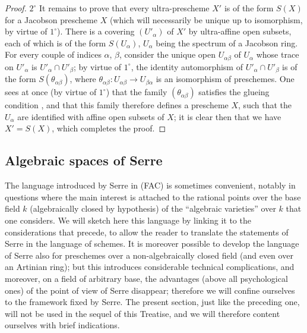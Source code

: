 \begin{proof}
$2^\circ$ It remains to prove that every ultra-prescheme $X'$ is of the form $S(X)$ for a Jacobson prescheme $X$ (which will necessarily be unique up to isomorphism, by virtue of $1^\circ$).
There is a covering $(U'_\alpha)$ of $X'$ by ultra-affine open subsets, each of which is of the form $S(U_\alpha)$, $U_\alpha$ being the spectrum of a Jacobson ring.
For every couple of indices $\alpha$, $\beta$, consider the unique open $U_{\alpha\beta}$ of $U_\alpha$ whose trace on $U'_\alpha$ is $U'_\alpha\cap U'_\beta$; by virtue of $1^\circ$, the identity automorphism of $U'_\alpha\cap U'_\beta$ is of the form $S(\theta_{\alpha\beta})$, where $\theta_{\alpha\beta}:U_{\alpha\beta}\to U_{\beta\alpha}$ is an isomorphism of preschemes.
One sees at once (by virtue of $1^\circ$) that the family $(\theta_{\alpha\beta})$ satisfies the glueing condition , and that this family therefore defines a prescheme $X$, such that the $U_\alpha$ are identified with affine open subsets of $X$; it is clear then that we have $X'=S(X)$, which completes the proof.
\end{proof}

\subsection{Algebraic spaces of Serre}
\label{subsection:IV.10.10}

\begin{env}[10.10.1]
\label{IV.10.10.1}
The language introduced by Serre in (FAC) is sometimes convenient, notably in questions where the main interest is attached to the rational points over the base field $k$ (algebraically closed by hypothesis) of the ``algebraic varieties'' over $k$ that one considers.
We will sketch here this language by linking it to the considerations that precede, to allow the reader to translate the statements of Serre in the language of schemes.
It is moreover possible to develop the language of Serre also for preschemes over a non-algebraically closed field (and even over an Artinian ring); but this introduces considerable technical complications, and moreover, on a field of arbitrary base, the advantages (above all psychological ones) of the point of view of Serre disappear; therefore we will confine ourselves to the framework fixed by Serre.
The present section, just like the preceding one, will not be used in the sequel of this Treatise, and we will therefore content ourselves with brief indications.
\end{env}

